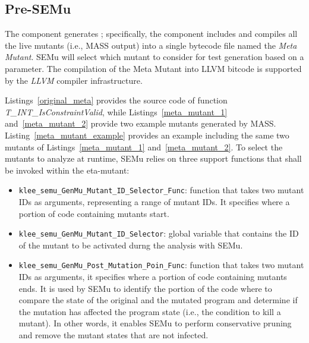 




\subsection{Pre-SEMu}

The  component generates ; specifically, the component includes and compiles all the live mutants (i.e., MASS output) into a single bytecode file named the \emph{Meta Mutant}. SEMu will select which mutant to consider for test generation based on a parameter. The compilation of the Meta Mutant into LLVM bitcode is supported by the \emph{LLVM} compiler infrastructure. 



Listings~\ref{original_meta} provides the source code of function \emph{T\_INT\_IsConstraintValid}, while Listings~\ref{meta_mutant_1} and~\ref{meta_mutant_2} provide two example mutants generated by MASS.
Listing~\ref{meta_mutant_example} provides an example  including the same two mutants of Listings~\ref{meta_mutant_1} and~\ref{meta_mutant_2}. 
To select the mutants to analyze at runtime, SEMu relies on three support functions that shall be invoked within the eta-mutant:

\begin{itemize}
	\item \texttt{klee\_semu\_GenMu\_Mutant\_ID\_Selector\_Func}: function that takes two mutant IDs as arguments, representing a range of mutant IDs. It specifies where a portion of code containing mutants start.
    \item \texttt{klee\_semu\_GenMu\_Mutant\_ID\_Selector}: global variable that contains the ID of the mutant to be activated durng the analysis with SEMu.
	\item \texttt{klee\_semu\_GenMu\_Post\_Mutation\_Poin\_Func}: 
	function that takes two mutant IDs as arguments, it specifies where a portion of code containing mutants ends.
	It is used by SEMu to identify the portion of the code where to compare the state of the original and the mutated program and determine if the mutation has affected the program state (i.e., the  condition to kill a mutant). In other words, it enables SEMu to perform conservative pruning and remove the mutant states that are not infected.
\end{itemize}

